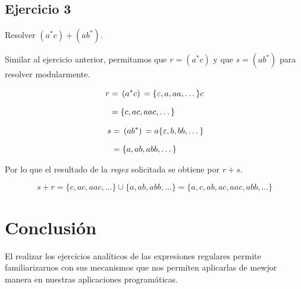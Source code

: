 \documentclass[stu, 12pt, letterpaper, donotrepeattitle, floatsintext, natbib]{apa7}
\begin{document}
\subsection*{Ejercicio 3}
\begin{justifying}
Resolver \((a^{*}c)+(ab^{*})\).\par
\vspace{\baselineskip}
Similar al ejercicio anterior, permitamos que \(r=\left(a^{*}c\right)\) y que \(s=\left(ab^{*}\right)\) para resolver modularmente.
\end{justifying}
\begin{equation*}
    \setlength{\jot}{10pt}
    \begin{align*}
        \begin{split}
            r ={}& \left(a^{*}c\right) {}= \{\varepsilon, a, aa, \dots\}c\\
              ={}& \{c, ac, aac, \dots\}
        \end{split}\\
        \begin{split}
            s ={}& \left(ab^{*}\right) {}= a\{\varepsilon, b, bb ,\dots\}\\
              ={}& \{a, ab, abb, \dots\}
        \end{split}
    \end{align*}
\end{equation*}\par
\begin{justifying}
Por lo que el resultado de la \emph{regex} solicitada se obtiene por \(r+s\).
\end{justifying}
\[s+r = \{c, ac, aac, \dots\}\cup\{a, ab, abb, \dots\}=\{a, c, ab, ac, aac,abb,\dots\}\]
\vspace{\baselineskip}
\section*{Conclusión}
\begin{justifying}
El realizar los ejercicios analíticos de las expresiones regulares permite familiarizarnos con sus mecanismos
que nos permiten aplicarlas de mewjor manera en nuestras aplicaciones programáticas.\par
\end{justifying}
\end{document}

